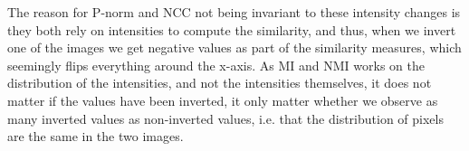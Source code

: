The reason for P-norm and NCC not being invariant to these intensity changes is they both rely on intensities to compute the similarity, and thus, when we invert one of the images we get negative values as part of the similarity measures, which seemingly flips everything around the x-axis. As MI and NMI works on the distribution of the intensities, and not the intensities themselves, it does not matter if the values have been inverted, it only matter whether we observe as many inverted values as non-inverted values, i.e. that the distribution of pixels are the same in the two images.